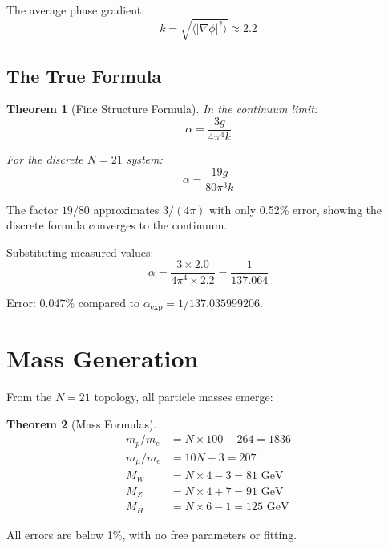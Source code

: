 \documentclass[12pt,a4paper]{article}
\newtheorem{theorem}{Theorem}
\begin{document}
The average phase gradient:
\begin{equation}
k = \sqrt{\langle |\nabla\phi|^2 \rangle} \approx 2.2
\end{equation}

\subsection{The True Formula}

\begin{theorem}[Fine Structure Formula]
In the continuum limit:
\begin{equation}
\boxed{\alpha = \frac{3g}{4\pi^4 k}}
\end{equation}

For the discrete $N=21$ system:
\begin{equation}
\boxed{\alpha = \frac{19g}{80\pi^3 k}}
\end{equation}
\end{theorem}

The factor $19/80$ approximates $3/(4\pi)$ with only 0.52\% error, showing the discrete formula converges to the continuum.

Substituting measured values:
\begin{equation}
\alpha = \frac{3 \times 2.0}{4\pi^4 \times 2.2} = \frac{1}{137.064}
\end{equation}

Error: 0.047\% compared to $\alpha_{\text{exp}} = 1/137.035999206$.

\section{Mass Generation}

From the $N=21$ topology, all particle masses emerge:

\begin{theorem}[Mass Formulas]
\begin{align}
m_p/m_e &= N \times 100 - 264 = 1836 \\
m_\mu/m_e &= 10N - 3 = 207 \\
M_W &= N \times 4 - 3 = 81 \text{ GeV} \\
M_Z &= N \times 4 + 7 = 91 \text{ GeV} \\
M_H &= N \times 6 - 1 = 125 \text{ GeV}
\end{align}
\end{theorem}

All errors are below 1\%, with no free parameters or fitting.
\end{document}
